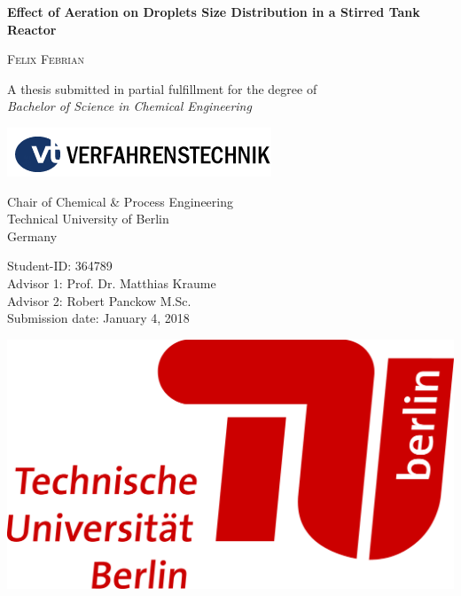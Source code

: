 \begin{titlepage}
\thispagestyle{empty}

\begin{center}
	\LARGE
	\textsf{\textbf{Effect of Aeration on Droplets Size Distribution in a Stirred Tank Reactor}} \\
    \vspace{2cm}
        
    \large
    \textsc{Felix Febrian}
	\vspace{5cm}

	\large
	A thesis submitted in partial fulfillment for the degree of \\
    \textit{Bachelor of Science in Chemical Engineering}
        
	\vspace{2cm}	
	\includegraphics[scale=1]{pictures/vt_logo.png}
 
	Chair of Chemical \& Process Engineering \\
	Technical University of Berlin \\
    Germany
\end{center}

\normalsize
\vfill
\noindent   \begin{minipage}{0.6\textwidth} %
Student-ID:			\tabto{4.0cm} 364789	\\
Advisor 1:			\tabto{4.0cm} Prof. Dr. Matthias Kraume \\
Advisor 2:			\tabto{4.0cm} Robert Panckow M.Sc. \\
Submission date:		\tabto{4.0cm} January 4, 2018
\end{minipage}
\begin{minipage}{0.3\textwidth}
    \hfill \includegraphics[scale=0.5]{pictures/TU_Logo_lang_4c_rot.png}
\end{minipage}

\end{titlepage}

